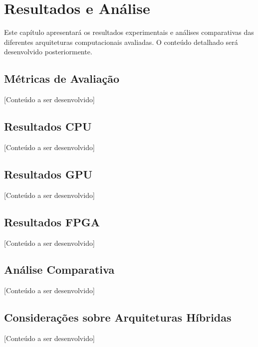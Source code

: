 \chapter{Resultados e Análise}\label{chp:resultados}

Este capítulo apresentará os resultados experimentais e análises comparativas das diferentes arquiteturas computacionais avaliadas. O conteúdo detalhado será desenvolvido posteriormente.

\section{Métricas de Avaliação}\label{sec:metricas_avaliacao}

[Conteúdo a ser desenvolvido]

\section{Resultados CPU}\label{sec:resultados_cpu}

[Conteúdo a ser desenvolvido]

\section{Resultados GPU}\label{sec:resultados_gpu}

[Conteúdo a ser desenvolvido]

\section{Resultados FPGA}\label{sec:resultados_fpga}

[Conteúdo a ser desenvolvido]

\section{Análise Comparativa}\label{sec:analise_comparativa}

[Conteúdo a ser desenvolvido]

\section{Considerações sobre Arquiteturas Híbridas}\label{sec:analise_hibridas}

[Conteúdo a ser desenvolvido] 
